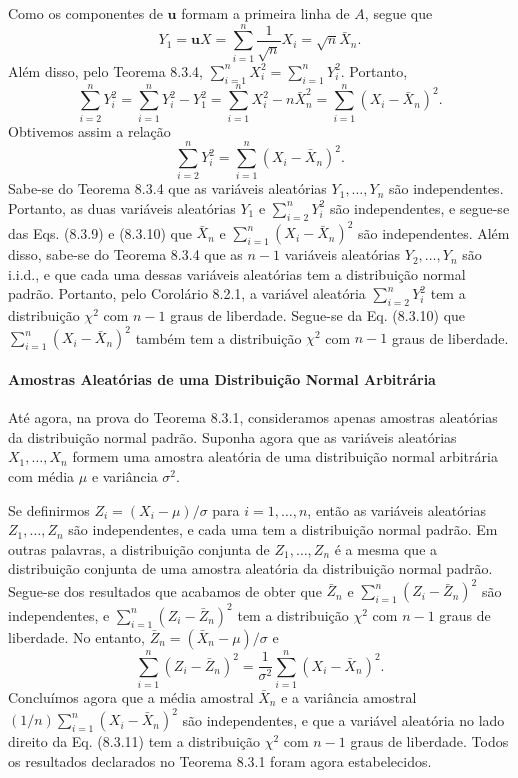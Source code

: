 Como os componentes de $\mathbf{u}$ formam a primeira linha de $A$, segue que
$$
Y_1 = \mathbf{u}X = \sum_{i=1}^n \frac{1}{\sqrt{n}}X_i = \sqrt{n}\bar{X}_n.
$$
Além disso, pelo Teorema 8.3.4, $\sum_{i=1}^n X_i^2 = \sum_{i=1}^n Y_i^2$. Portanto,
$$
\sum_{i=2}^n Y_i^2 = \sum_{i=1}^n Y_i^2 - Y_1^2 = \sum_{i=1}^n X_i^2 - n\bar{X}_n^2 = \sum_{i=1}^n(X_i - \bar{X}_n)^2.
$$
Obtivemos assim a relação
$$
\sum_{i=2}^n Y_i^2 = \sum_{i=1}^n(X_i - \bar{X}_n)^2.
$$
Sabe-se do Teorema 8.3.4 que as variáveis aleatórias $Y_1, \dots, Y_n$ são independentes. Portanto, as duas variáveis aleatórias $Y_1$ e $\sum_{i=2}^n Y_i^2$ são independentes, e segue-se das Eqs. (8.3.9) e (8.3.10) que $\bar{X}_n$ e $\sum_{i=1}^n(X_i - \bar{X}_n)^2$ são independentes. Além disso, sabe-se do Teorema 8.3.4 que as $n-1$ variáveis aleatórias $Y_2, \dots, Y_n$ são i.i.d., e que cada uma dessas variáveis aleatórias tem a distribuição normal padrão. Portanto, pelo Corolário 8.2.1, a variável aleatória $\sum_{i=2}^n Y_i^2$ tem a distribuição $\chi^2$ com $n-1$ graus de liberdade. Segue-se da Eq. (8.3.10) que $\sum_{i=1}^n(X_i - \bar{X}_n)^2$ também tem a distribuição $\chi^2$ com $n-1$ graus de liberdade.

\paragraph{Amostras Aleatórias de uma Distribuição Normal Arbitrária}
Até agora, na prova do Teorema 8.3.1, consideramos apenas amostras aleatórias da distribuição normal padrão. Suponha agora que as variáveis aleatórias $X_1, \dots, X_n$ formem uma amostra aleatória de uma distribuição normal arbitrária com média $\mu$ e variância $\sigma^2$.

Se definirmos $Z_i = (X_i - \mu)/\sigma$ para $i=1, \dots, n$, então as variáveis aleatórias $Z_1, \dots, Z_n$ são independentes, e cada uma tem a distribuição normal padrão. Em outras palavras, a distribuição conjunta de $Z_1, \dots, Z_n$ é a mesma que a distribuição conjunta de uma amostra aleatória da distribuição normal padrão. Segue-se dos resultados que acabamos de obter que $\bar{Z}_n$ e $\sum_{i=1}^n(Z_i - \bar{Z}_n)^2$ são independentes, e $\sum_{i=1}^n(Z_i - \bar{Z}_n)^2$ tem a distribuição $\chi^2$ com $n-1$ graus de liberdade. No entanto, $\bar{Z}_n = (\bar{X}_n - \mu)/\sigma$ e
$$
\sum_{i=1}^n (Z_i - \bar{Z}_n)^2 = \frac{1}{\sigma^2}\sum_{i=1}^n(X_i - \bar{X}_n)^2.
$$
Concluímos agora que a média amostral $\bar{X}_n$ e a variância amostral $(1/n)\sum_{i=1}^n(X_i - \bar{X}_n)^2$ são independentes, e que a variável aleatória no lado direito da Eq. (8.3.11) tem a distribuição $\chi^2$ com $n-1$ graus de liberdade. Todos os resultados declarados no Teorema 8.3.1 foram agora estabelecidos.

